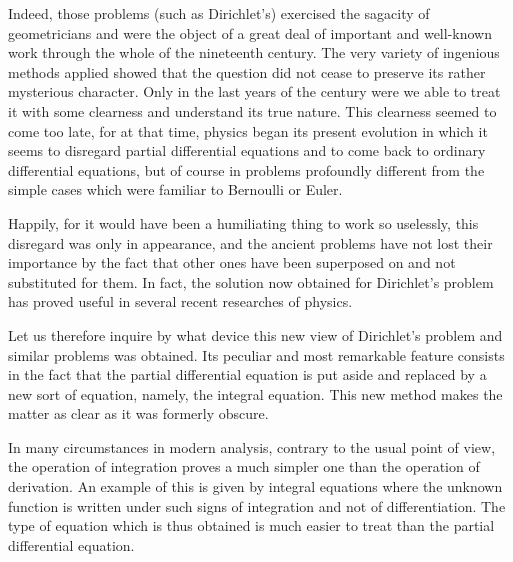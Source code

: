 \documentclass[12pt,oneside]{book}
\begin{document}
Indeed, those problems (such as Dirichlet's) exercised the sagacity of
geometricians and were the object of a great deal of important and well-known
work through the whole of the nineteenth century. The very variety of ingenious
methods applied showed that the question did not cease to preserve its rather
mysterious character. Only in the last years of the century were we able to
treat it with some clearness and understand its true nature. This clearness
seemed to come too late, for at that time, physics began its present evolution
in which it seems to disregard partial differential equations and to come back
to ordinary differential equations, but of course in problems profoundly
different from the simple cases which were familiar to Bernoulli or Euler. \par

Happily, for it would have been a humiliating thing to work so uselessly, this
disregard was only in appearance, and the ancient problems have not lost their
importance by the fact that other ones have been superposed on and not
substituted for them. In fact, the solution now obtained for Dirichlet's problem
has proved useful in several recent researches of physics. \par

Let us therefore inquire by what device this new view of Dirichlet's problem and
similar problems was obtained. Its peculiar and most remarkable feature
consists in the fact that the partial differential equation is put aside and
replaced by a new sort of equation, namely, the integral equation. This new
method makes the matter as clear as it was formerly obscure. \par

In many circumstances in modern analysis, contrary to the usual point of view,
the operation of integration proves a much simpler one than the operation of
derivation. An example of this is given by integral equations where the unknown
function is written under such signs of integration and not of differentiation.
The type of equation which is thus obtained is much easier to treat than the
partial differential equation. \par
\end{document}
